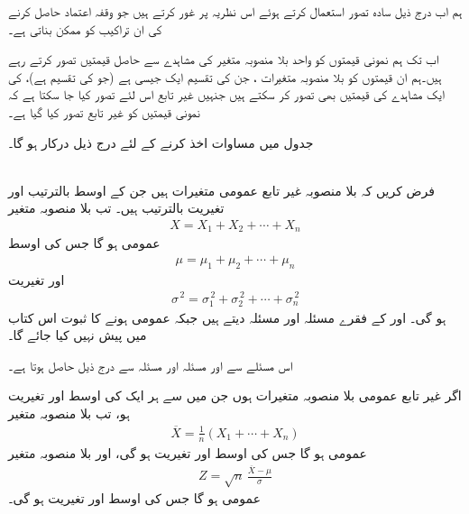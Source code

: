 ہم اب درج ذیل سادہ تصور استعمال کرتے ہوئے اس نظریہ پر غور کرتے ہیں جو وقفہ اعتماد حاصل کرنے کی ان تراکیب کو ممکن بناتی ہے۔

اب تک ہم نمونی قیمتوں  کو واحد بلا منصوبہ متغیر  کی  مشاہدے سے حاصل  قیمتیں تصور کرتے رہے ہیں۔ہم ان  قیمتوں کو  بلا منصوبہ متغیرات ، جن کی تقسیم ایک جیسی ہے (جو  کی تقسیم ہے)، کی  ایک مشاہدے کی قیمتیں بھی تصور کر سکتے ہیں جنہیں غیر تابع اس لئے تصور کیا جا سکتا ہے کہ نمونی قیمتیں کو غیر تابع تصور کیا گیا ہے۔

 جدول  میں مساوات  اخذ کرنے  کے لئے درج ذیل درکار ہو گا۔

\quad {}\\
فرض کریں کہ  بلا منصوبہ غیر تابع عمومی متغیرات ہیں جن کے اوسط بالترتیب  اور تغیریت بالترتیب  ہیں۔ تب بلا منصوبہ متغیر
\begin{align*}
X=X_1+X_2+\cdots+X_n
\end{align*}
عمومی ہو گا جس کی اوسط
\begin{align*}
\mu=\mu_1+\mu_2+\cdots+\mu_n
\end{align*}
اور تغیریت
\begin{align*}
\sigma^{\,2}=\sigma^{\,2}_1+\sigma^{\,2}_2+\cdots+\sigma^{\,2}_n
\end{align*}
ہو گی۔ اور  کے فقرے مسئلہ  اور مسئلہ  دیتے ہیں جبکہ  عمومی ہونے کا ثبوت اس کتاب میں پیش نہیں کیا جائے گا۔

اس مسئلے سے اور مسئلہ  اور مسئلہ  سے درج ذیل حاصل ہوتا ہے۔

\quad
اگر  غیر تابع عمومی بلا منصوبہ متغیرات ہوں جن میں سے ہر ایک کی اوسط  اور تغیریت  ہو، تب بلا منصوبہ متغیر
\begin{align}\label{مساوات-شماریات_غیر_تابع_متغیرات_اوسط_تغیریت_الف}
\overline{X}=\frac{1}{n}(X_1+\cdots+X_n)
\end{align}
عمومی ہو گا جس کی اوسط  اور تغیریت  ہو گی، اور بلا منصوبہ متغیر
\begin{align}\label{مساوات-شماریات_غیر_تابع_متغیرات_اوسط_تغیریت_ب}
Z=\sqrt{n}\,\frac{\overline{X}-\mu}{\sigma}
\end{align}
عمومی ہو گا جس کی اوسط  اور تغیریت  ہو گی۔

